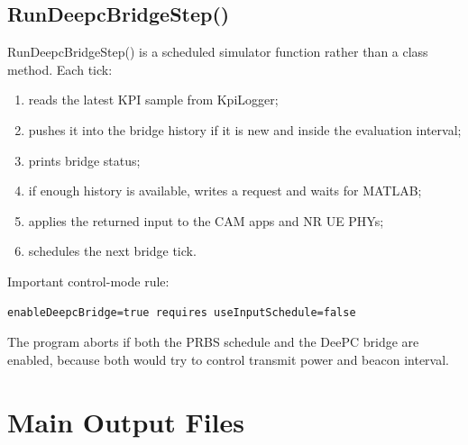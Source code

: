 \documentclass[11pt]{article}
\DeclareRobustCommand{\code}[1]{\texttt{\detokenize{#1}}}
\def\code#1{#1}%
\begin{document}
\subsection{\code{RunDeepcBridgeStep()}}

\code{RunDeepcBridgeStep()} is a scheduled simulator function rather than a class
method.  Each tick:

\begin{enumerate}
  \item reads the latest KPI sample from \code{KpiLogger};
  \item pushes it into the bridge history if it is new and inside the evaluation
  interval;
  \item prints bridge status;
  \item if enough history is available, writes a request and waits for MATLAB;
  \item applies the returned input to the CAM apps and NR UE PHYs;
  \item schedules the next bridge tick.
\end{enumerate}

Important control-mode rule:

\begin{lstlisting}[style=textstyle]
enableDeepcBridge=true requires useInputSchedule=false
\end{lstlisting}

The program aborts if both the PRBS schedule and the DeePC bridge are enabled,
because both would try to control transmit power and beacon interval.

\section{Main Output Files}
\end{document}
